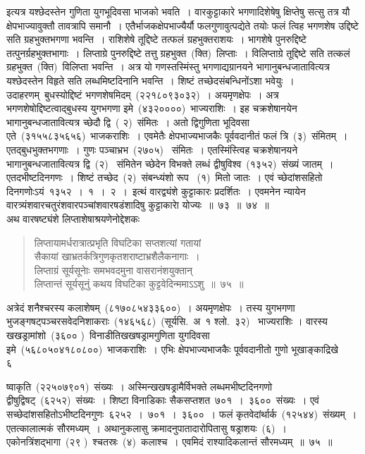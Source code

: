 \documentclass[11pt, openany]{book}
\begin{document}
\newpage
\thispagestyle{fancy}
\fancyhf{}
\noindent
इत्यत्र यश्छेदस्तेन गुणिता युगभूदिवसा भाजको भवति~। वारकुट्टाकारे भगणादिशेषेषु क्षिप्तेषु सत्सु तत्र यौ क्षेपभाज्यावुक्तौ तावत्रापि समानौ~। एतैर्भाजकक्षेपभाज्यैर्यौ फलगुणावुत्पद्येते तयोः फलं त्विह भगणशेष उद्दिष्टे सति ग्रहभुक्तभगणा भवन्ति~। राशिशेषे तूद्दिष्टे तत्फलं ग्रहभुक्तराशयः~। भागशेषे पुनरुद्दिष्टे तत्पुनर्ग्रहभुक्तभागाः~। लिप्ताग्रे पुनरुद्दिष्टे तत्तु ग्रहभुक्त~(क्ति)~लिप्ताः~। विलिप्ताग्रे तूद्दिष्टे सति तत्कलं ग्रहभुक्त~(क्ति)~विलिप्ता भवन्ति~। अत्र यो गणस्तस्मिंस्तु भगणाद्यग्रानयने भागानुबन्धजातावित्यत्र यश्छेदस्तेन विहृते सति लब्धमिष्टदिनानि भवन्ति~। शिष्टं तच्छेदसंबन्धिनोंऽशा भवेयुः~। उदाहरणम्\textendash\ बुधस्योद्दिष्टं भगणशेषमिदम्~(२२१८०९३०३२)~। अयमृणक्षेपः~। अत्र भगणशेषोद्दिष्टत्वाद्बुधस्य युगभगणा इमे~(४३२००००)~भाज्यराशिः~। इह चक्रशेषानयेन भागानुबन्धजातावित्यत्र च्छेदौ द्वि~( २)~संमितः~। अतो द्विगुणिता भूदिवसा एते~(३१५५८३५६५६)~भाजकराशिः~। एवमेतैः क्षेपभाज्यभाजकैः पूर्ववदानीतं फलं त्रि~(३)~संमितम्~। एतद्बुधभुक्तभगणाः~। गुणः पञ्चाभ्रभ~(२७०५)~ संमितः~। एतस्मिंस्त्विह चक्रशेषानयने भागानुबन्धजातावित्यत्र द्वि~(२)~ संमितेन च्छेदेन विभक्ते लब्धं द्वीषुविश्व~(१३५२)~संख्यं जातम्~। एतदभीष्टदिनगणः~। शिष्टं तच्छेद~(२)~संबन्ध्यंशो रूप ~(१)~मितो जातः~। एवं च्छेदांशसहितो दिनगणोःऽयं~१३५२~।~१~।~२~।~इत्थं वारद्व्यंशे कुट्टाकारः प्रदर्शितः~। एवमनेन न्यायेन वारत्र्यंशवारचतुरंशवारपञ्चांशवारषडंशादिषु कुट्टाकाराे योज्यः~॥~७३~॥~७४~॥\\
\indent
अथ वारषष्ट्यंशे लिप्ताशेषाश्रयणेनोद्देशकः\textendash
\begin{quote}
{\ku लिप्तायामर्धरात्रात्प्रभृति विघटिका सप्तशत्यां गतायां\\
सैकायां खाभ्रतर्कत्रिगुणकृतशराष्टाभ्रशैलैकनागाः~।\\
लिप्ताग्रं सूर्यसूनाेः समभवदमुना वासरानंशयुक्तान्\\
लिप्तान्तं सूर्यसूनुं कथय विघटिका कुट्टवेदिन्ममाऽऽशु~॥~७५~॥}
\end{quote}
\indent
अत्रेदं शनैश्चरस्य कलाशेषम्~(८१७०८५४३३६००)~। अयमृणक्षेपः~। तस्य युगभगणा भुजङ्गषट्पञ्चरसवेदनिशाकराः~(१४६५६८)~(सूर्यसि.~अ~१ श्लो.~३२)~ भाज्यराशिः । वारस्य खखड्रामांशो~(३६०० )~विनाडीतिखखषड्रामगुणिता युगदिवसा इमे~(५६८०५०४१८०८००)~भाजकराशिः~। एभिः क्षेपभाज्यभाजकैः पूर्ववदानीतो गुणो भूखाङ्काद्रिखे\textendash\\
\indent
६

\newpage
\thispagestyle{fancy}
\fancyhf{}
\noindent
ष्वाकृति~(२२५०७९०१)~संख्यः~। अस्मिन्खखषड्रामैर्विभक्ते लब्धमभीष्टदिनगणो द्वीषुद्विषट्~(६२५२)~संख्यः~। शिष्टा विनाडिकाः सैकसप्तशत~७०१~।~३६००~संख्यः~। एवं सच्छेदांशसहितोऽभीष्टदिनगुणः~६२५२~।~७०१~।~३६००~। फलं कृतवेदांर्थार्क~(१२५४४)~संख्यम्~। एतत्कालात्मकं सौरमध्यम्~। अथानुकलासु क्रमादनुपातादारोपितासु षड्राशयः~(६)~। एकोनत्रिंशद्भागा~(२९ )~श्चतस्रः~(४)~कलाश्च~। एवमिदं राश्यादिकलान्तं सौरमध्यम्~॥~७५~॥\\
\end{document}

